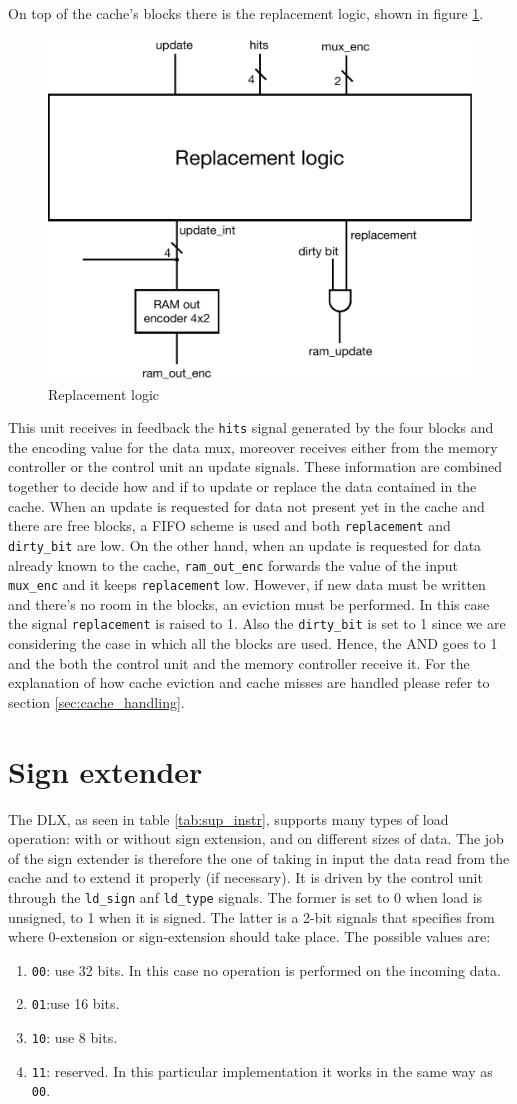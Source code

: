 On top of the cache's blocks there is the replacement logic, shown in figure \ref{fig:dcache_replacement}.

\begin{figure}[!ht]
	\centering
	\includegraphics[width=0.6\linewidth]{./chapters/figures/dcache_replacement.pdf}
	\caption{Replacement logic}
	\label{fig:dcache_replacement}
\end{figure}

This unit receives in feedback the \verb|hits| signal generated by the four blocks and the encoding value for the data mux, moreover receives either from the memory controller or the control unit
an update signals. These information are combined together to decide how and if to update or replace the data contained in the cache.
When an update is requested for data not present yet in the cache and there are free blocks, a FIFO scheme is used and both \verb|replacement| and \verb|dirty_bit| are low.
On the other hand, when an update is requested for data already known to the cache, \verb|ram_out_enc| forwards the value of the input \verb|mux_enc| and it keeps \verb|replacement| low.
However, if new data must be written and there's no room in the blocks, an eviction must be performed. In this case the signal \verb|replacement| is raised to 1. Also the \verb|dirty_bit| is set to 1
since we are considering the case in which all the blocks are used. Hence, the AND goes to 1 and the both the control unit and the memory controller receive it.
For the explanation of how cache eviction and cache misses are handled please refer to section \ref{sec:cache_handling}.

\section{Sign extender}

The DLX, as seen in table \ref{tab:sup_instr}, supports many types of load operation: with or without sign extension, and on different sizes of data. The job of the sign extender is therefore the one
of taking in input the data read from the cache and to extend it properly (if necessary). It is driven by the control unit through the \verb|ld_sign| anf \verb|ld_type| signals. The former is set to 0
when load is unsigned, to 1 when it is signed. The latter is a 2-bit signals that specifies from where 0-extension or sign-extension should take place. The possible values are:

\begin{enumerate}
    \item \verb|00|: use 32 bits. In this case no operation is performed on the incoming data.
    \item \verb|01|:use 16 bits.
    \item \verb|10|: use 8 bits.
    \item \verb|11|: reserved. In this particular implementation it works in the same way as \verb|00|.
\end{enumerate}